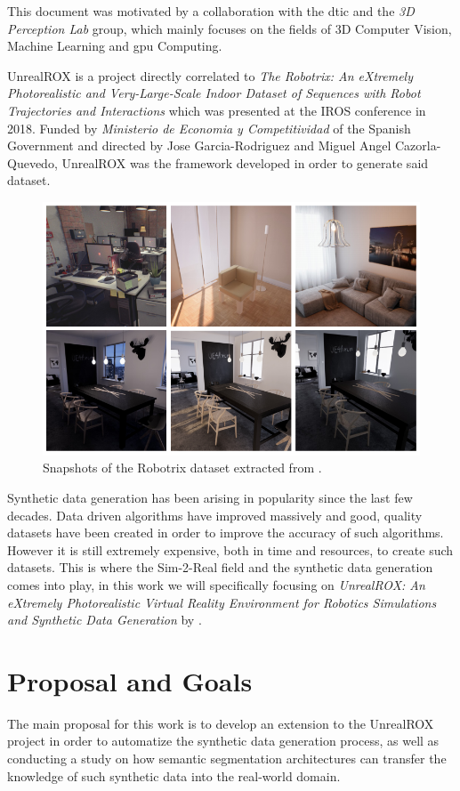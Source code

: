 This document was motivated by a collaboration with the \gls{dtic} and the \textit{3D Perception Lab} group, which mainly focuses on the fields of 3D Computer Vision, Machine Learning and \gls{gpu} Computing.

UnrealROX is a project directly correlated to \textit{The Robotrix: An eXtremely Photorealistic and Very-Large-Scale Indoor Dataset of Sequences with Robot Trajectories and Interactions} \cite{DBLP:journals/corr/abs-1901-06514} which was presented at the IROS conference in 2018. Funded by \textit{Ministerio de Economia y Competitividad} of the Spanish Government and directed by Jose Garcia-Rodriguez and Miguel Angel Cazorla-Quevedo, UnrealROX was the framework developed in order to generate said dataset.

\begin{figure}
	\centering
	\includegraphics[width=0.7\linewidth]{archivos/robotrix}
		\caption{Snapshots of the Robotrix dataset extracted from \cite{DBLP:journals/corr/abs-1901-06514}.}
	\label{fig:robotrix}
\end{figure}

Synthetic data generation has been arising in popularity since the last few decades. Data driven algorithms have improved massively and good, quality datasets have been created in order to improve the accuracy of such algorithms. However it is still extremely expensive, both in time and resources, to create such datasets. This is where the Sim-2-Real field and the synthetic data generation comes into play, in this work we will specifically focusing on \textit{UnrealROX: An eXtremely Photorealistic Virtual Reality Environment for Robotics Simulations and Synthetic Data Generation} by \cite{DBLP:journals/corr/abs-1810-06936}.

\section{Proposal and Goals}
\label{sec:goals}
The main proposal for this work is to develop an extension to the UnrealROX project in order to automatize the synthetic data generation process, as well as conducting a study on how semantic segmentation architectures can transfer the knowledge of such synthetic data into the real-world domain.

